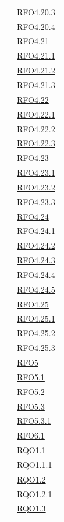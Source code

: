 \begin{longtable}{|>{\centering}m{5cm}|m{5cm}<{\centering}|}
& \hyperlink{RFO4.20.3}{RFO4.20.3}\\
& \hyperlink{RFO4.20.4}{RFO4.20.4}\\
& \hyperlink{RFO4.21}{RFO4.21}\\
& \hyperlink{RFO4.21.1}{RFO4.21.1}\\
& \hyperlink{RFO4.21.2}{RFO4.21.2}\\
& \hyperlink{RFO4.21.3}{RFO4.21.3}\\
& \hyperlink{RFO4.22}{RFO4.22}\\
& \hyperlink{RFO4.22.1}{RFO4.22.1}\\
& \hyperlink{RFO4.22.2}{RFO4.22.2}\\
& \hyperlink{RFO4.22.3}{RFO4.22.3}\\
& \hyperlink{RFO4.23}{RFO4.23}\\
& \hyperlink{RFO4.23.1}{RFO4.23.1}\\
& \hyperlink{RFO4.23.2}{RFO4.23.2}\\
& \hyperlink{RFO4.23.3}{RFO4.23.3}\\
& \hyperlink{RFO4.24}{RFO4.24}\\
& \hyperlink{RFO4.24.1}{RFO4.24.1}\\
& \hyperlink{RFO4.24.2}{RFO4.24.2}\\
& \hyperlink{RFO4.24.3}{RFO4.24.3}\\
& \hyperlink{RFO4.24.4}{RFO4.24.4}\\
& \hyperlink{RFO4.24.5}{RFO4.24.5}\\
& \hyperlink{RFO4.25}{RFO4.25}\\
& \hyperlink{RFO4.25.1}{RFO4.25.1}\\
& \hyperlink{RFO4.25.2}{RFO4.25.2}\\
& \hyperlink{RFO4.25.3}{RFO4.25.3}\\
& \hyperlink{RFO5}{RFO5}\\
& \hyperlink{RFO5.1}{RFO5.1}\\
& \hyperlink{RFO5.2}{RFO5.2}\\
& \hyperlink{RFO5.3}{RFO5.3}\\
& \hyperlink{RFO5.3.1}{RFO5.3.1}\\
& \hyperlink{RFO6.1}{RFO6.1}\\
& \hyperlink{RQO1.1}{RQO1.1}\\
& \hyperlink{RQO1.1.1}{RQO1.1.1}\\
& \hyperlink{RQO1.2}{RQO1.2}\\
& \hyperlink{RQO1.2.1}{RQO1.2.1}\\
& \hyperlink{RQO1.3}{RQO1.3}\\

\end{longtable}
